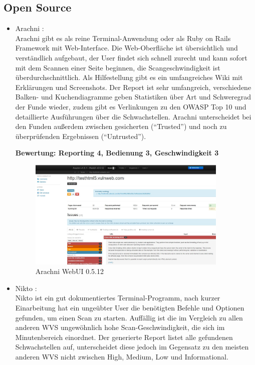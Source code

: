 \documentclass[12pt,oneside,a4paper,parskip]{scrbook}
\begin{document}
    \subsection{Open Source}
        \begin{itemize}
          \item Arachni \cite{Arachni}:\\
            Arachni gibt es als reine Terminal-Anwendung oder als Ruby on Rails Framework mit Web-Interface. Die Web-Oberfläche ist übersichtlich und verständlich aufgebaut, der User findet sich schnell zurecht und kann sofort mit dem Scannen einer Seite beginnen, die Scangeschwindigkeit ist überdurchschnittlich. Als Hilfestellung gibt es ein umfangreiches Wiki mit Erklärungen und Screenshots. Der Report ist sehr umfangreich, verschiedene Balken- und Kuchendiagramme geben Statistiken über Art und Schweregrad der Funde wieder, zudem gibt es Verlinkungen zu den OWASP Top 10 und detaillierte Ausführungen über die Schwachstellen. Arachni unterscheidet bei den Funden außerdem zwischen gesicherten (``Trusted'') und noch zu überprüfenden Ergebnissen (``Untrusted'').

            \textbf{Bewertung: Reporting 4, Bedienung 3, Geschwindigkeit 3}
            \begin{figure}[H]
              \centering
              \includegraphics[width=0.9\textwidth]{Images/Arachni}
              \caption[Arachni WebUI 0.5.12]{Arachni WebUI 0.5.12}
            \end{figure}
          \item Nikto \cite{Nikto}:\\
            Nikto ist ein gut dokumentiertes Terminal-Programm, nach kurzer Einarbeitung hat ein ungeübter User die benötigten Befehle und Optionen gefunden, um einen Scan zu starten.
            Auffällig ist die im Vergleich zu allen anderen WVS ungewöhnlich hohe Scan-Geschwindigkeit, die sich im Minutenbereich einordnet.
            Der generierte Report listet alle gefundenen Schwachstellen auf, unterscheidet diese jedoch im Gegensatz zu den meisten anderen WVS nicht zwischen High, Medium, Low und Informational.


\end{itemize}
\end{document}
